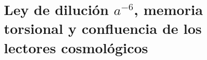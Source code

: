 \section{Ley de dilución \(a^{-6}\), memoria torsional y confluencia de los lectores cosmológicos}

